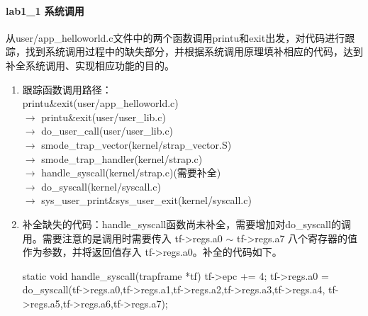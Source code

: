 



\paragraph{lab1_1 系统调用}
从user/app_helloworld.c文件中的两个函数调用printu和exit出发，对代码进行跟踪，找到系统调用过程中的缺失部分，并根据系统调用原理填补相应的代码，达到补全系统调用、实现相应功能的目的。

\begin{enumerate}
    \item 跟踪函数调用路径：\\
    printu\&exit(user/app_helloworld.c)\\ $\rightarrow$ printu\&exit(user/user_lib.c)\\ $\rightarrow$ do_user_call(user/user_lib.c)\\ $\rightarrow$  smode_trap_vector(kernel/strap_vector.S)\\
    $\rightarrow$ smode_trap_handler(kernel/strap.c)\\
    $\rightarrow$ handle_syscall(kernel/strap.c)(需要补全)\\
    $\rightarrow$ do_syscall(kernel/syscall.c)\\
    $\rightarrow$ sys_user_print\&sys_user_exit(kernel/syscall.c)
    \item 补全缺失的代码：handle_syscall函数尚未补全，需要增加对do_syscall的调用。需要注意的是调用时需要传入 tf->regs.a0 $\sim$ tf->regs.a7 八个寄存器的值作为参数，并将返回值存入 tf->regs.a0。补全的代码如下。
    \begin{cppcode}
static void handle_syscall(trapframe *tf) {
  tf->epc += 4;
  tf->regs.a0 = do_syscall(tf->regs.a0,tf->regs.a1,tf->regs.a2,tf->regs.a3,tf->regs.a4,
    tf->regs.a5,tf->regs.a6,tf->regs.a7);
}
\end{cppcode}
\end{enumerate}

